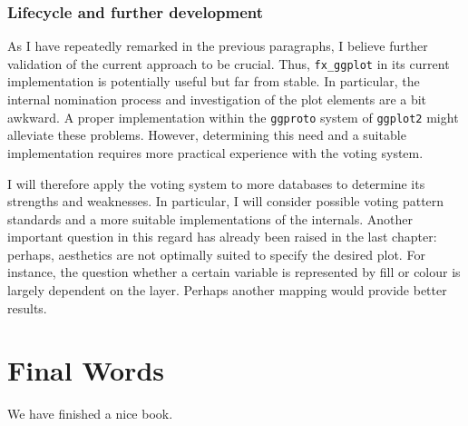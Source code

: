\documentclass[]{report}
\theoremstyle{definition}
\theoremstyle{definition}
\theoremstyle{definition}
\theoremstyle{remark}
\begin{document}
\subsection{Lifecycle and further
development}\label{lifecycle-and-further-development}

As I have repeatedly remarked in the previous paragraphs, I believe
further validation of the current approach to be crucial. Thus,
\texttt{fx\_ggplot} in its current implementation is potentially useful
but far from stable. In particular, the internal nomination process and
investigation of the plot elements are a bit awkward. A proper
implementation within the \texttt{ggproto} system of \texttt{ggplot2}
might alleviate these problems. However, determining this need and a
suitable implementation requires more practical experience with the
voting system.

I will therefore apply the voting system to more databases to determine
its strengths and weaknesses. In particular, I will consider possible
voting pattern standards and a more suitable implementations of the
internals. Another important question in this regard has already been
raised in the last chapter: perhaps, aesthetics are not optimally suited
to specify the desired plot. For instance, the question whether a
certain variable is represented by fill or colour is largely dependent
on the layer. Perhaps another mapping would provide better results.

\chapter{Final Words}\label{final-words}

We have finished a nice book.


\end{document}
